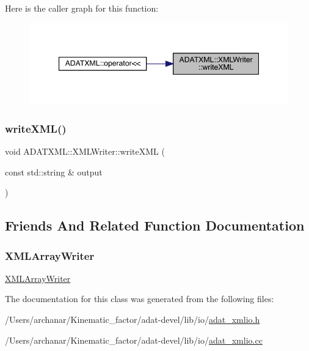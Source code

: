 Here is the caller graph for this function\+:
\nopagebreak
\begin{figure}[H]
\begin{center}
\leavevmode
\includegraphics[width=347pt]{da/da7/classADATXML_1_1XMLWriter_a887415a6f26bde42e76af7d831087c7e_icgraph}
\end{center}
\end{figure}
\mbox{\label{classADATXML_1_1XMLWriter_a887415a6f26bde42e76af7d831087c7e}} 
\subsubsection{\texorpdfstring{writeXML()}{writeXML()}\hspace{0.1cm}{\footnotesize\ttfamily [3/3]}}
{\footnotesize\ttfamily void A\+D\+A\+T\+X\+M\+L\+::\+X\+M\+L\+Writer\+::write\+X\+ML (\begin{DoxyParamCaption}\item[{const std\+::string \&}]{output }\end{DoxyParamCaption})}



\subsection{Friends And Related Function Documentation}
\mbox{\label{classADATXML_1_1XMLWriter_a5aadf941042ceaf969503029ae4f005b}} 
\subsubsection{\texorpdfstring{XMLArrayWriter}{XMLArrayWriter}}
{\footnotesize\ttfamily \mbox{\hyperlink{classADATXML_1_1XMLArrayWriter}{X\+M\+L\+Array\+Writer}}\hspace{0.3cm}{\ttfamily [friend]}}



The documentation for this class was generated from the following files\+:\begin{DoxyCompactItemize}
\item 
/\+Users/archanar/\+Kinematic\+\_\+factor/adat-\/devel/lib/io/\mbox{\hyperlink{adat-devel_2lib_2io_2adat__xmlio_8h}{adat\+\_\+xmlio.\+h}}\item 
/\+Users/archanar/\+Kinematic\+\_\+factor/adat-\/devel/lib/io/\mbox{\hyperlink{adat-devel_2lib_2io_2adat__xmlio_8cc}{adat\+\_\+xmlio.\+cc}}\end{DoxyCompactItemize}

